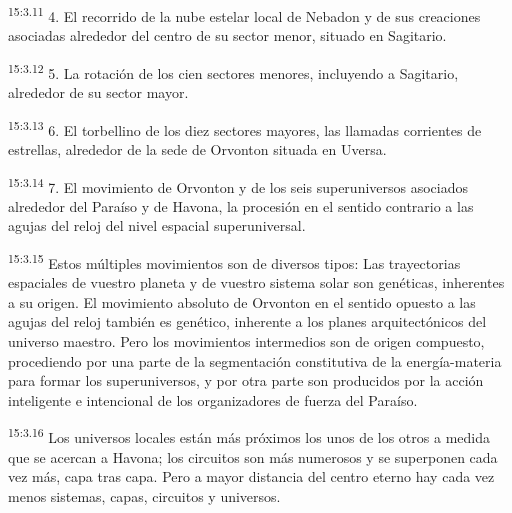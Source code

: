 \par
\textsuperscript{15:3.11} 4. El recorrido de la nube estelar local de Nebadon y de sus creaciones asociadas alrededor del centro de su sector menor, situado en Sagitario.

\par
\textsuperscript{15:3.12} 5. La rotación de los cien sectores menores, incluyendo a Sagitario, alrededor de su sector mayor.

\par
\textsuperscript{15:3.13} 6. El torbellino de los diez sectores mayores, las llamadas corrientes de estrellas, alrededor de la sede de Orvonton situada en Uversa.

\par
\textsuperscript{15:3.14} 7. El movimiento de Orvonton y de los seis superuniversos asociados alrededor del Paraíso y de Havona, la procesión en el sentido contrario a las agujas del reloj del nivel espacial superuniversal.

\par
\textsuperscript{15:3.15} Estos múltiples movimientos son de diversos tipos: Las trayectorias espaciales de vuestro planeta y de vuestro sistema solar son genéticas, inherentes a su origen. El movimiento absoluto de Orvonton en el sentido opuesto a las agujas del reloj también es genético, inherente a los planes arquitectónicos del universo maestro. Pero los movimientos intermedios son de origen compuesto, procediendo por una parte de la segmentación constitutiva de la energía-materia para formar los superuniversos, y por otra parte son producidos por la acción inteligente e intencional de los organizadores de fuerza del Paraíso.

\par
\textsuperscript{15:3.16} Los universos locales están más próximos los unos de los otros a medida que se acercan a Havona; los circuitos son más numerosos y se superponen cada vez más, capa tras capa. Pero a mayor distancia del centro eterno hay cada vez menos sistemas, capas, circuitos y universos.

